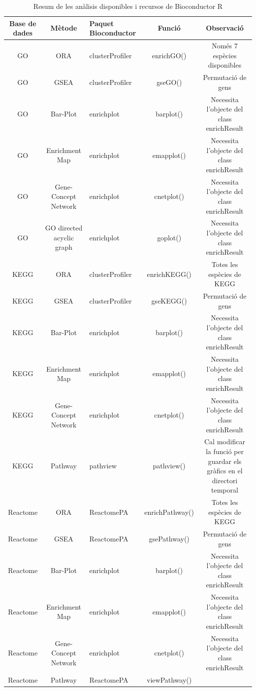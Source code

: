 \begin{table}[H]
\begin{adjustbox}{width=1\textwidth}
\small
\begin{tabular}{|| c | c | l | c | c ||} 
\hline
Base de dades & Mètode & Paquet Bioconductor & Funció & Observació \\ [0.5ex] 
\hline\hline
GO & ORA & clusterProfiler & enrichGO() & Només 7 espècies disponibles \\ 
\hline
GO & GSEA & clusterProfiler & gseGO() & Permutació de gens \\
\hline
GO & Bar-Plot & enrichplot & barplot() & Necessita l'objecte del class enrichResult \\
\hline
GO & Enrichment Map & enrichplot & emapplot() & Necessita l'objecte del class enrichResult \\
\hline
GO & Gene-Concept Network & enrichplot & cnetplot() & Necessita l'objecte del class enrichResult \\
\hline
GO & GO directed acyclic graph & enrichplot & goplot() & Necessita l'objecte del class enrichResult \\
\hline\hline
KEGG & ORA & clusterProfiler & enrichKEGG() & Totes les espècies de KEGG \\ 
\hline
KEGG & GSEA & clusterProfiler & gseKEGG() & Permutació de gens \\
\hline
KEGG & Bar-Plot & enrichplot & barplot() & Necessita l'objecte del class enrichResult \\
\hline
KEGG & Enrichment Map & enrichplot & emapplot() & Necessita l'objecte del class enrichResult \\
\hline
KEGG & Gene-Concept Network & enrichplot & cnetplot() & Necessita l'objecte del class enrichResult \\
\hline
KEGG & Pathway & pathview & pathview() & Cal modificar la funció per guardar els gràfics en el directori temporal \\
\hline\hline
Reactome & ORA & ReactomePA & enrichPathway() & Totes les espècies de KEGG \\ 
\hline
Reactome & GSEA & ReactomePA & gsePathway() & Permutació de gens \\
\hline
Reactome & Bar-Plot & enrichplot & barplot() & Necessita l'objecte del class enrichResult \\
\hline
Reactome & Enrichment Map & enrichplot & emapplot() & Necessita l'objecte del class enrichResult \\
\hline
Reactome & Gene-Concept Network & enrichplot & cnetplot() & Necessita l'objecte del class enrichResult \\
\hline
Reactome & Pathway & ReactomePA & viewPathway() &  \\
\hline
\hline
\end{tabular}
\end{adjustbox}
\caption{Resum de les anàlisis disponibles i recursos de Bioconductor R} 
\end{table}



